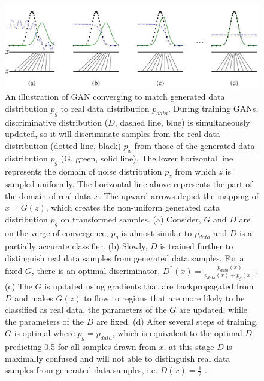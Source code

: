\begin{figure}[H]
        \begin{center}
	    \includegraphics[scale=0.49]{images/Fundamentals/GANTraining.jpg}
	    \caption[An illustration of \ac{GAN} converging to match generated data distribution $p_g$ to real data distribution $p_{data}$.]{An illustration of \ac{GAN} converging to match generated data distribution $p_g$ to real data distribution $p_{data}$. During training \acp{GAN}, discriminative distribution ($D$, dashed line, blue) is simultaneously updated, so it will discriminate samples from the real data distribution (dotted line, black) $p_x$ from those of the generated data distribution $p_g$ (G, green, solid line). The lower horizontal line represents the domain of noise distribution $p_z$ from which $z$ is sampled uniformly. The horizontal line above represents the part of the domain of real data $x$. The upward arrows depict the mapping of $x = G(z)$, which creates the non-uniform generated data distribution $p_g$ on transformed samples. (a) Consider, $G$ and $D$ are on the verge of convergence, $p_g$ is almost similar to $p_{data}$ and $D$ is a partially accurate classifier. (b) Slowly, $D$ is trained further to distinguish real data samples from generated data samples. For a fixed $G$, there is an optimal discriminator, $D^*(x) = \frac{p_{data}(x)}{p_{data}(x) + p_g(x)}$. (c) The $G$ is updated using gradients that are backpropagated from $D$ and makes $G(z)$ to flow to regions that are more likely to be classified as real data, the parameters of the $G$ are updated, while the parameters of the $D$ are fixed. (d) After several steps of training, $G$ is optimal where $p_g = p_{data}$, which is equivalent to the optimal $D$ predicting 0.5 for all samples drawn from $x$, at this stage $D$ is maximally confused and will not able to distinguish real data samples from generated data samples, i.e. $D(x) = \frac{1}{2}$ \cite{goodfellow2014generative}.}
	    \label{fig:GANTraining}
	    \end{center}
\end{figure}

